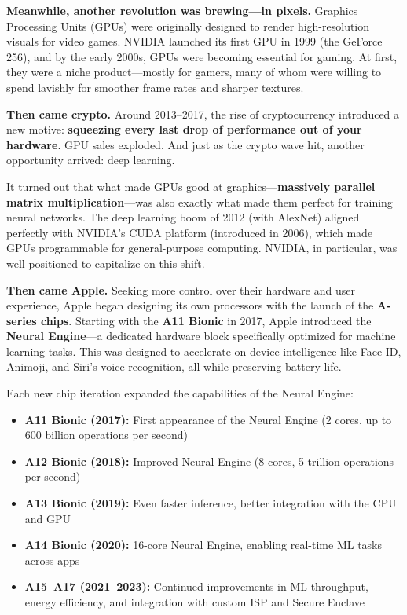 \medskip

\noindent\textbf{Meanwhile, another revolution was brewing—in pixels.} Graphics Processing Units (GPUs) were originally designed to render high-resolution visuals for video games. NVIDIA launched its first GPU in 1999 (the GeForce 256), and by the early 2000s, GPUs were becoming essential for gaming. At first, they were a niche product—mostly for gamers, many of whom were willing to spend lavishly for smoother frame rates and sharper textures.

\textbf{Then came crypto.} Around 2013–2017, the rise of cryptocurrency introduced a new motive: \textbf{squeezing every last drop of performance out of your hardware}. GPU sales exploded. And just as the crypto wave hit, another opportunity arrived: deep learning.

It turned out that what made GPUs good at graphics—\textbf{massively parallel matrix multiplication}—was also exactly what made them perfect for training neural networks. The deep learning boom of 2012 (with AlexNet) aligned perfectly with NVIDIA’s CUDA platform (introduced in 2006), which made GPUs programmable for general-purpose computing. NVIDIA, in particular, was well positioned to capitalize on this shift.

\medskip

\noindent\textbf{Then came Apple.} Seeking more control over their hardware and user experience, Apple began designing its own processors with the launch of the \textbf{A-series chips}. Starting with the \textbf{A11 Bionic} in 2017, Apple introduced the \textbf{Neural Engine}—a dedicated hardware block specifically optimized for machine learning tasks. This was designed to accelerate on-device intelligence like Face ID, Animoji, and Siri's voice recognition, all while preserving battery life.

\medskip

\noindent Each new chip iteration expanded the capabilities of the Neural Engine:

\begin{itemize}
    \item \textbf{A11 Bionic (2017):} First appearance of the Neural Engine (2 cores, up to 600 billion operations per second)
    \item \textbf{A12 Bionic (2018):} Improved Neural Engine (8 cores, 5 trillion operations per second)
    \item \textbf{A13 Bionic (2019):} Even faster inference, better integration with the CPU and GPU
    \item \textbf{A14 Bionic (2020):} 16-core Neural Engine, enabling real-time ML tasks across apps
    \item \textbf{A15–A17 (2021–2023):} Continued improvements in ML throughput, energy efficiency, and integration with custom ISP and Secure Enclave
\end{itemize}

